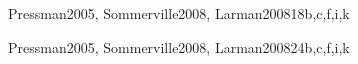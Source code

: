 \begin{syllabus}
\begin{unit}{\SESoftwareDesign}{}{Pressman2005, Sommerville2008, Larman2008}{18}{b,c,f,i,k}
\begin{learningoutcomes}
			\item \SESoftwareDesignLOExplainHowMight [\Familiarity] %
			\item \SESoftwareDesignLODesignAA [\Usage] %
			\item \SESoftwareDesignLODiscussAnd [\Usage] %
			\item \SESoftwareDesignLOApplyModels [\Usage] %
			\item \SESoftwareDesignLOAnalyzeAFrom [\Assessment] %
			\item \SESoftwareDesignLOAnalyzeAFromOf [\Assessment] %
			\item \SESoftwareDesignLOExplainTheObjects [\Familiarity] %
			\item \SESoftwareDesignLOApplyComponent [\Usage] %
			\item \SESoftwareDesignLORefactorAn [\Usage] %
			\item \SESoftwareDesignLOStateAnd [\Familiarity] %
		\end{learningoutcomes}
	\end{unit}
	
	\begin{unit}{\SESoftwareConstruction}{}{Pressman2005, Sommerville2008, Larman2008}{24}{b,c,f,i,k}
		\begin{topics}
			\item \SESoftwareConstructionTopicCoding
			\item \SESoftwareConstructionTopicCodingStandards
			\item \SESoftwareConstructionTopicIntegration
			\item \SESoftwareConstructionTopicDevelopment
			\item \SESoftwareConstructionTopicPotential
		\end{topics}
	\begin{learningoutcomes}
			\item \SESoftwareConstructionLODescribeTechniques[\Assessment]
			\item \SESoftwareConstructionLOBuild[\Assessment]
			\item \SESoftwareConstructionLODescribeSecure[\Assessment]
			\item \SESoftwareConstructionLOSelectAndDefined[\Assessment]
			\item \SESoftwareConstructionLOCompareAndStrategies[\Assessment]
			\item \SESoftwareConstructionLODescribeTheAnalyzing[\Assessment]
			\item \SESoftwareConstructionLODescribeTheAnalyzingChanges[\Assessment]
			\item \SESoftwareConstructionLORewrite[\Assessment]
			\item \SESoftwareConstructionLOWriteAThatNon[\Assessment]
		\end{learningoutcomes}
	\end{unit}
	
	\begin{coursebibliography}
	\end{coursebibliography}
	
	\end{syllabus}
	
	